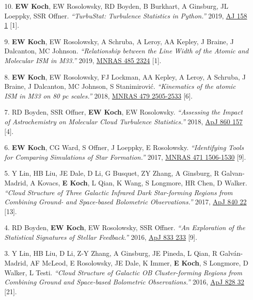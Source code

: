 \documentclass[letterpaper,11pt]{article}
\newenvironment{publist}{
  \begingroup
  \raggedright
  \begin{description}[leftmargin=4ex,style=sameline]
}{
  \end{description}
  \endgroup
}
\begin{document}
\begin{publist}
\item[10.] \textbf{EW Koch}, EW Rosolowsky, RD Boyden, B Burkhart, A Ginsburg, JL Loeppky, SSR Offner. \textit{``TurbuStat: Turbulence Statistics in Python.''} 2019, \href{http://adsabs.harvard.edu/abs/2019AJ....158....1K}{AJ 158 1} [1].
\item[9.] \textbf{EW Koch}, EW Rosolowsky, A Schruba, A Leroy, AA Kepley, J Braine, J Dalcanton, MC Johnson. \textit{``Relationship between the Line Width of the Atomic and Molecular ISM in M33.''} 2019, \href{http://adsabs.harvard.edu/abs/2019MNRAS.485.2324K}{MNRAS 485 2324} [1].
\item[8.] \textbf{EW Koch}, EW Rosolowsky, FJ Lockman, AA Kepley, A Leroy, A Schruba, J Braine, J Dalcanton, MC Johnson, S Stanimirovi\'{c}. \textit{``Kinematics of the atomic ISM in M33 on 80 pc scales.''} 2018, \href{http://adsabs.harvard.edu/abs/2018MNRAS.479.2505K}{MNRAS 479 2505-2533} [6].
\item[7.] RD Boyden, SSR Offner, \textbf{EW Koch}, EW Rosolowsky. \textit{``Assessing the Impact of Astrochemistry on Molecular Cloud Turbulence Statistics.''} 2018, \href{http://adsabs.harvard.edu/abs/2018ApJ...860..157B}{ApJ 860 157} [4].
\item[6.] \textbf{EW Koch}, CG Ward, S Offner, J Loeppky, E Rosolowsky. \textit{``Identifying Tools for Comparing Simulations of Star Formation.''} 2017, \href{http://adsabs.harvard.edu/abs/2017MNRAS.471.1506K}{MNRAS 471 1506-1530} [9].
\item[5.] Y Lin, HB Liu, JE Dale, D Li, G Busquet, ZY Zhang, A Ginsburg, R Galvan-Madrid, A Kovacs, \textbf{E Koch}, L Qian, K Wang, S Longmore, HR Chen, D Walker. \textit{``Cloud Structure of Three Galactic Infrared Dark Star-forming Regions from Combining Ground- and Space-based Bolometric Observations.''} 2017, \href{http://adsabs.harvard.edu/abs/2017ApJ...840...22L}{ApJ 840 22} [13].
\item[4.] RD Boyden, \textbf{EW Koch}, EW Rosolowsky, SSR Offner. \textit{``An Exploration of the Statistical Signatures of Stellar Feedback.''} 2016, \href{http://adsabs.harvard.edu/abs/2016ApJ...833..233B}{ApJ 833 233} [9].
\item[3.] Y Lin, HB Liu, D Li, Z-Y Zhang, A Ginsburg, JE Pineda, L Qian, R Galv\'{a}n-Madrid, AF McLeod, E Rosolowsky, JE Dale, K Immer, \textbf{E Koch}, S Longmore, D Walker, L Testi. \textit{``Cloud Structure of Galactic OB Cluster-forming Regions from Combining Ground and Space-based Bolometric Observations.''} 2016, \href{http://adsabs.harvard.edu/abs/2016ApJ...828...32L}{ApJ 828 32} [21].

\end{publist}
\end{document}
